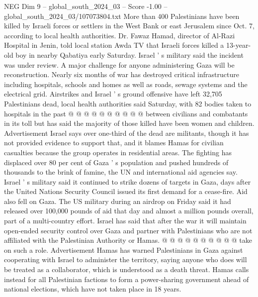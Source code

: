 \begin{textsample}{NEG Dim 9 – global\_south\_2024\_03 – Score -1.00 – global\_south\_2024\_03/107073804.txt}
More than 400 Palestinians have been killed by Israeli forces or settlers in the West Bank or east Jerusalem since Oct. 7, according to local health authorities.
Dr.
Fawaz Hamad, director of Al-Razi Hospital in Jenin, told local station Awda TV that Israeli forces killed a 13-year-old boy in nearby Qabatiya early Saturday.
Israel ' s military said the incident was under review.
A major challenge for anyone administering Gaza will be reconstruction.
Nearly six months of war has destroyed critical infrastructure including hospitals, schools and homes as well as roads, sewage systems and the electrical grid.
Airstrikes and Israel ' s ground offensive have left 32,705 Palestinians dead, local health authorities said Saturday, with 82 bodies taken to hospitals in the past @ @ @ @ @ @ @ @ @ @ between civilians and combatants in its toll but has said the majority of those killed have been women and children.
Advertisement Israel says over one-third of the dead are militants, though it has not provided evidence to support that, and it blames Hamas for civilian casualties because the group operates in residential areas.
The fighting has displaced over 80 per cent of Gaza ' s population and pushed hundreds of thousands to the brink of famine, the UN and international aid agencies say.
Israel ' s military said it continued to strike dozens of targets in Gaza, days after the United Nations Security Council issued its first demand for a cease-fire.
Aid also fell on Gaza.
The US military during an airdrop on Friday said it had released over 100,000 pounds of aid that day and almost a million pounds overall, part of a multi-country effort.
Israel has said that after the war it will maintain open-ended security control over Gaza and partner with Palestinians who are not affiliated with the Palestinian Authority or Hamas. @ @ @ @ @ @ @ @ @ @ take on such a role.
Advertisement Hamas has warned Palestinians in Gaza against cooperating with Israel to administer the territory, saying anyone who does will be treated as a collaborator, which is understood as a death threat.
Hamas calls instead for all Palestinian factions to form a power-sharing government ahead of national elections, which have not taken place in 18 years.

\end{textsample}
